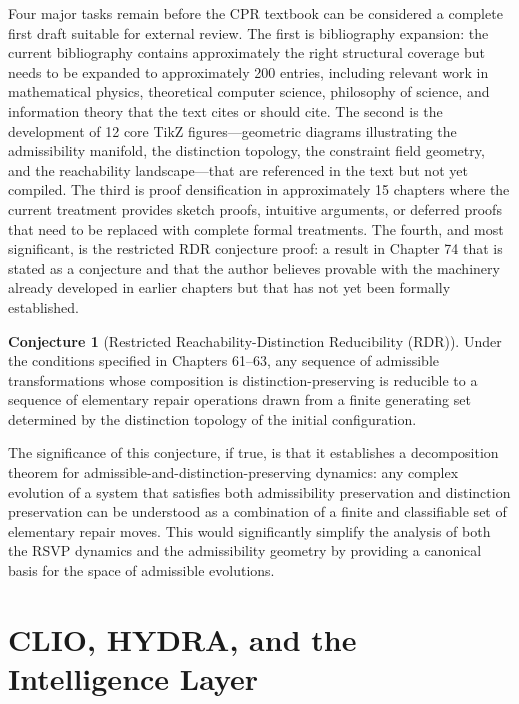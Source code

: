 \documentclass[11pt, oneside]{book}
\theoremstyle{definition}
\newtheorem{conjecture}{Conjecture}[chapter]
\theoremstyle{remark}
\begin{document}
Four major tasks remain before the CPR textbook can be considered a complete first draft suitable for external review. The first is bibliography expansion: the current bibliography contains approximately the right structural coverage but needs to be expanded to approximately 200 entries, including relevant work in mathematical physics, theoretical computer science, philosophy of science, and information theory that the text cites or should cite. The second is the development of 12 core TikZ figures—geometric diagrams illustrating the admissibility manifold, the distinction topology, the constraint field geometry, and the reachability landscape—that are referenced in the text but not yet compiled. The third is proof densification in approximately 15 chapters where the current treatment provides sketch proofs, intuitive arguments, or deferred proofs that need to be replaced with complete formal treatments. The fourth, and most significant, is the restricted RDR conjecture proof: a result in Chapter 74 that is stated as a conjecture and that the author believes provable with the machinery already developed in earlier chapters but that has not yet been formally established.

\begin{conjecture}[Restricted Reachability-Distinction Reducibility (RDR)]
Under the conditions specified in Chapters 61–63, any sequence of admissible transformations whose composition is distinction-preserving is reducible to a sequence of elementary repair operations drawn from a finite generating set determined by the distinction topology of the initial configuration.
\end{conjecture}

The significance of this conjecture, if true, is that it establishes a decomposition theorem for admissible-and-distinction-preserving dynamics: any complex evolution of a system that satisfies both admissibility preservation and distinction preservation can be understood as a combination of a finite and classifiable set of elementary repair moves. This would significantly simplify the analysis of both the RSVP dynamics and the admissibility geometry by providing a canonical basis for the space of admissible evolutions.


\chapter{CLIO, HYDRA, and the Intelligence Layer}
\end{document}
